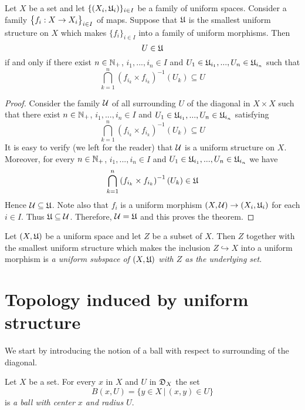 \begin{theorem}\label{theorem:description_of_uniform_structure_introduced_by_a_family_of_maps}
Let $X$ be a set and let $\{(X_i,{\mathfrak U}_i)\}_{i\in I}$ be a family of uniform spaces. Consider a family $\big\{f_i:X\rightarrow X_i\big\}_{i\in I}$ of maps. Suppose that ${\mathfrak U}$ is the smallest uniform structure on $X$ which makes $\{f_i\}_{i\in I}$ into a family of uniform morphisms. Then 
$$U \in {\mathfrak U}$$
if and only if there exist $n\in {\mathbb N}_+$, $i_1,...,i_n\in I$ and $U_1 \in {\mathfrak U}_{i_1},...,U_n\in {\mathfrak U}_{i_n}$ such that
$$\bigcap_{k=1}^n\left(f_{i_k}\times f_{i_k}\right)^{-1}(U_k) \subseteq U$$
\end{theorem}
\begin{proof}
Consider the family ${\mathcal U}$ of all surrounding $U$ of the diagonal in $X\times X$ such that there exist $n\in {\mathbb N}_+$, $i_1,...,i_n\in I$ and $U_1 \in {\mathfrak U}_{i_1},...,U_n\in {\mathfrak U}_{i_n}$ satisfying
$$\bigcap_{k=1}^n\left(f_{i_k}\times f_{i_k}\right)^{-1}(U_k) \subseteq U$$
It is easy to verify (we left for the reader) that ${\mathcal U}$ is a uniform structure on $X$. Moreover, for every $n\in {\mathbb N}_+$, $i_1,...,i_n\in I$ and $U_1 \in {\mathfrak U}_{i_1},...,U_n\in {\mathfrak U}_{i_n}$ we have
$$\bigcap_{k=1}^n\left(f_{i_k}\times f_{i_k}\right)^{-1}(U_k) \in {\mathfrak U}$$
Hence ${\mathcal U} \subseteq {\mathfrak U}$. Note also that $f_i$ is a uniform morphism $(X,{\mathcal U})\rightarrow (X_i,{\mathfrak U}_i)$ for each $i\in I$. Thus ${\mathfrak U} \subseteq {\mathcal U}$. Therefore, ${\mathcal U} = {\mathfrak U}$ and this proves the theorem. 
\end{proof}

\begin{definition}
Let $(X,{\mathfrak U})$ be a uniform space and let $Z$ be a subset of $X$. Then $Z$ together with the smallest uniform structure which makes the inclusion $Z\hookrightarrow X$ into a uniform morphism is \textit{a uniform subspace of $(X,{\mathfrak U})$ with $Z$ as the underlying set}.
\end{definition}

\section{Topology induced by uniform structure}
\noindent
We start by introducing the notion of a ball with respect to surrounding of the diagonal.

\begin{definition}
Let $X$ be a set. For every $x$ in $X$ and $U$ in ${\mathfrak D}_X$ the set
$$B(x,U) = \big\{y\in X\,\big|\,(x,y)\in U\big\}$$
is \textit{a ball with center $x$ and radius $U$}.
\end{definition}

